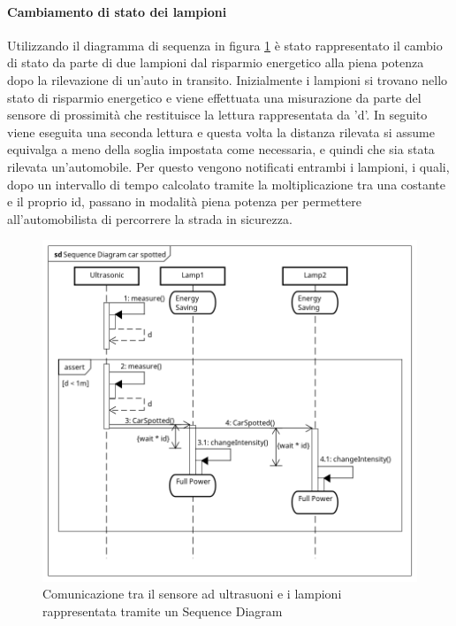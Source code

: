 \paragraph{Cambiamento di stato dei lampioni}
Utilizzando il diagramma di sequenza in figura \ref{SD CAR} è stato rappresentato il cambio di stato da parte di due lampioni dal risparmio energetico alla piena potenza dopo la rilevazione di un'auto in transito.
Inizialmente i lampioni si trovano nello stato di risparmio energetico e viene effettuata una misurazione da parte del sensore di prossimità che restituisce la lettura rappresentata da 'd'.
In seguito viene eseguita una seconda lettura e questa volta la distanza rilevata si assume equivalga a meno della soglia impostata come necessaria, e quindi che sia stata rilevata un'automobile.
Per questo vengono notificati entrambi i lampioni, i quali, dopo un intervallo di tempo calcolato tramite la moltiplicazione tra una costante e il proprio id, passano in modalità piena potenza per permettere all'automobilista di percorrere la strada in sicurezza.
\begin{figure}[tbp]
	\centering
	\includegraphics[scale=.59]{figure/Sequence_Diagram_car_spotted.png}
	\caption{Comunicazione tra il sensore ad ultrasuoni e i lampioni rappresentata tramite un Sequence Diagram \label{SD CAR}}
\end{figure}
